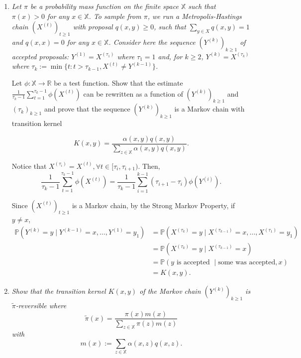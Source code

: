 \documentclass[a4paper,12pt]{article}
\newcommand{\R}{\mathbb{R}}
\newcommand{\pr}{\mathbb{P}}
\theoremstyle{definition}
\begin{document}
\begin{enumerate}
    \item {\it Let $\pi$ be a probability mass function on the finite space
    $\mathbb{X}$ such that $\pi(x) > 0$ for any $x \in \mathbb{X}$.
    To sample from $\pi$, we run a Metropolis-Hastings chain $(X^{(t)})_{t \ge
    1}$ with proposal $q(x, y) \ge 0$, such that $\sum_{y \in X} q (x, y) = 1$
    and $q(x, x) = 0$ for any $x \in \mathbb{X}$. Consider here the 
    sequence $(Y^{(k)})_{k\ge 1}$ of accepted proposals: $Y^{(1)} =
    X^{(\tau_1)}$ where $\tau_1 = 1$ and, for $k \ge 2$, $Y^{(k)} 
    = X^{(\tau_k)}$ where $\tau_k := \min\{t : t > \tau_{k-1}, X^{(t)} 
    \neq Y^{(k-1)}\}$.
    
    Let $\phi : \mathbb{X} \to \R$ be a test function. Show that the 
    estimate $\frac{1}{\tau_k - 1}\sum_{t=1}^{\tau_k-1} \phi(X^{(t)})$
    can be rewritten as a function of $(Y^{(k)})_{k\ge 1}$ and $(\tau_k)_{k
    \ge 1}$ and prove that the sequence $(Y^{(k)})_{k \ge  1}$ is a Markov
    chain with transition kernel 
    }
    $$
    K(x,y) = \frac{\alpha(x,y)q(x,y)}{\sum_{z \in \mathbb{X}} \alpha(x,y)q(x,y)}.
    $$

    Notice that $X^{(\tau_i)} = X^{(t)}, \forall t \in [\tau_i, \tau_{i+1})$. 
    Then, 
    $$
    \frac{1}{\tau_k - 1}\sum_{t=1}^{\tau_k-1} \phi(X^{(t)}) 
    = \frac{1}{\tau_k - 1} \sum_{i=1}^{k-1} (\tau_{i+1} - \tau_i)\phi(Y^{(i)}).
    $$

    Since $(X^{(t)})_{t \ge 1}$ is a Markov chain, by the Strong 
    Markov Property, if $y \neq x$, 
    \begin{equation*}
        \begin{split}
            \pr(Y^{(k)} = y \mid Y^{(k-1)} = x, \dots, Y^{(1)} = y_1) 
            &= \pr(X^{(\tau_k)} = y \mid X^{(\tau_{k-1})} = x, \dots, X^{(\tau_1)} = y_1) \\
            &= \pr(X^{(\tau_k)} = y \mid X^{(\tau_{k-1})} = x) \\ 
            &= \pr(y \text{ is accepted } \mid \text{some was accepted}, x) \\
            &= K(x,y).
        \end{split}
    \end{equation*}

    \item {\it Show that the transition kernel $K(x, y)$ of the 
    Markov chain $(Y^{(k)})_{k\ge 1}$ is $\tilde{\pi}$-reversible 
    where}
    $$
    \tilde{\pi}(x) = \frac{\pi(x)m(x)}{\sum_{z \in \mathbb{X}} \pi(z)m(z)}
    $$
    {\it with}
    $$
    m(x) := \sum_{z \in \mathbb{X}} \alpha(x,z)q(x,z).
    $$


\end{enumerate}
\end{document}
